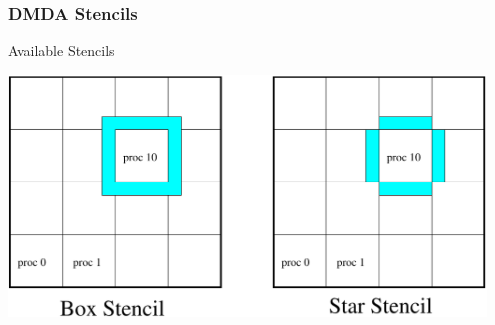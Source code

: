 \begin{frame}
\frametitle{DMDA Stencils}

\begin{block}{Available Stencils}
\end{block}

\begin{center}
\includegraphics[width=0.95\textwidth]{figures/DA/Stencils}
\end{center}
\end{frame}
